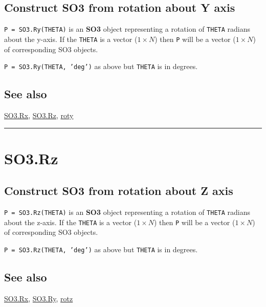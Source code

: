 \subsection*{Construct SO3 from rotation about Y axis}


\texttt{P = SO3.Ry(THETA)} is an \textbf{\color{red} SO3} object representing a rotation of \texttt{THETA}
radians about the y-axis.  If the \texttt{THETA} is a vector ($1 \times N$) then \texttt{P} will be
a vector ($1 \times N$) of corresponding SO3 objects.



\texttt{P = SO3.Ry(THETA, 'deg')} as above but \texttt{THETA} is in degrees.


\subsection*{See also}


\hyperlink{SO3.Rx}{\color{blue} SO3.Rx}, \hyperlink{SO3.Rz}{\color{blue} SO3.Rz}, \hyperlink{roty}{\color{blue} roty}

\vspace{1.5ex}\hrule

\hypertarget{SO3.Rz}{\section*{SO3.Rz}}
\subsection*{Construct SO3 from rotation about Z axis}


\texttt{P = SO3.Rz(THETA)} is an \textbf{\color{red} SO3} object representing a rotation of \texttt{THETA}
radians about the z-axis.  If the \texttt{THETA} is a vector ($1 \times N$) then \texttt{P} will be
a vector ($1 \times N$) of corresponding SO3 objects.



\texttt{P = SO3.Rz(THETA, 'deg')} as above but \texttt{THETA} is in degrees.


\subsection*{See also}


\hyperlink{SO3.Rx}{\color{blue} SO3.Rx}, \hyperlink{SO3.Ry}{\color{blue} SO3.Ry}, \hyperlink{rotz}{\color{blue} rotz}

